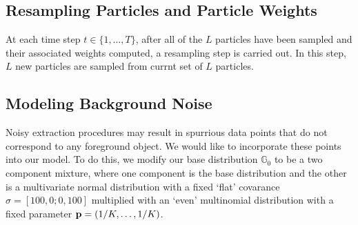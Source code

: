 \documentclass[smallcondensed, final]{svjour3}
\begin{document}
\subsection{Resampling Particles and Particle Weights}
\label{sec:resample}

At each time step $t \in \{ 1, \ldots, T \}$, after all of the $L$ particles have been sampled and their associated weights computed, a resampling step is carried out. In this step, $L$ new particles are sampled from currnt set of $L$ particles.





\subsection{Modeling Background Noise}

Noisy extraction procedures may result in spurrious data points that do not correspond to any foreground object. We would like to incorporate these points into our model. To do this, we modify our base distribution $\mathbb{G}_{0}$ to be a two component mixture, where one component is the base distribution and the other is a multivariate normal distribution with a fixed `flat' covarance $\sigma = [100, 0; 0, 100]$ multiplied with an `even' multinomial distribution with a fixed parameter $\bold{p} = (1/K, \ldots, 1/K)$.

\end{document}
